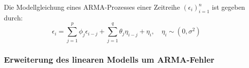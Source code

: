 Die Modellgleichung eines ARMA-Prozesses einer Zeitreihe $(\epsilon_i)_{i=1}^n$ ist gegeben durch:
\begin{equation}
    \epsilon_i = \sum_{j=1}^p \phi_j \epsilon_{i-j} + \sum_{j=1}^q \theta_j \eta_{i-j} + \eta_i, \quad \eta_i \sim (0, \sigma^2)
\end{equation}

\subsubsection{Erweiterung des linearen Modells um ARMA-Fehler}
